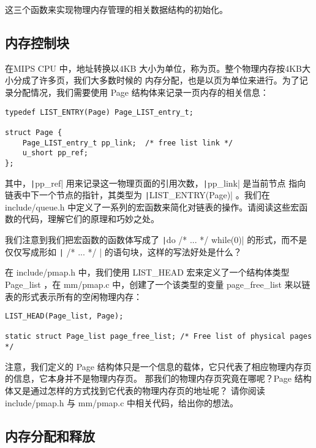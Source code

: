   这三个函数来实现物理内存管理的相关数据结构的初始化。

\subsection{内存控制块}

在MIPS CPU 中，地址转换以4KB 大小为单位，称为页。整个物理内存按4KB大小分成了许多页，我们大多数时候的
内存分配，也是以页为单位来进行。为了记录分配情况，我们需要使用 Page 结构体来记录一页内存的相关信息：

\begin{verbatim}
typedef LIST_ENTRY(Page) Page_LIST_entry_t;

struct Page {
    Page_LIST_entry_t pp_link;  /* free list link */
    u_short pp_ref;
};
\end{verbatim}

其中，\texttt|pp_ref| 用来记录这一物理页面的引用次数，\texttt|pp_link| 是当前节点
指向链表中下一个节点的指针，其类型为 \texttt|LIST_ENTRY(Page)| 。我们在 include/queue.h
中定义了一系列的宏函数来简化对链表的操作。请阅读这些宏函数的代码，理解它们的原理和巧妙之处。

\begin{thinking}\label{think-do_while}
我们注意到我们把宏函数的函数体写成了 \texttt|do { /* ... */ } while(0)| 的形式，而不是
仅仅写成形如
\texttt|{ /* ... */ }| 的语句块，这样的写法好处是什么？
\end{thinking}

在 include/pmap.h 中，我们使用 LIST\_HEAD 宏来定义了一个结构体类型 Page\_list ，在 mm/pmap.c
中，创建了一个该类型的变量 page\_free\_list 来以链表的形式表示所有的空闲物理内存：

\begin{verbatim}
LIST_HEAD(Page_list, Page);

static struct Page_list page_free_list; /* Free list of physical pages */
\end{verbatim}

\begin{thinking}\label{think-struct-page}
注意，我们定义的 Page 结构体只是一个信息的载体，它只代表了相应物理内存页的信息，它本身并不是物理内存页。
那我们的物理内存页究竟在哪呢？Page 结构体又是通过怎样的方式找到它代表的物理内存页的地址呢？
请你阅读 include/pmap.h 与 mm/pmap.c 中相关代码，给出你的想法。
\end{thinking}

\subsection{内存分配和释放}

